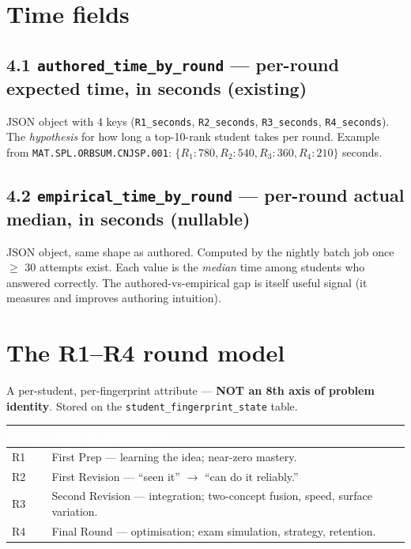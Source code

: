 \documentclass[11pt,letterpaper]{article}
\newcommand{\cd}[1]{\texttt{\small #1}}
\begin{document}
\section{Time fields}\label{sec:time}

\subsection*{4.1 \cd{authored\_time\_by\_round} --- per-round expected time, in seconds (existing)}

JSON object with 4 keys (\cd{R1\_seconds}, \cd{R2\_seconds}, \cd{R3\_seconds}, \cd{R4\_seconds}). The \emph{hypothesis} for how long a top-10-rank student takes per round. Example from \cd{MAT.SPL.ORBSUM.CNJSP.001}: $\{R_1: 780, R_2: 540, R_3: 360, R_4: 210\}$ seconds.

\subsection*{4.2 \cd{empirical\_time\_by\_round} --- per-round actual median, in seconds (nullable)}

JSON object, same shape as authored. Computed by the nightly batch job once $\geq$ 30 attempts exist. Each value is the \emph{median} time among students who answered correctly. The authored-vs-empirical gap is itself useful signal (it measures and improves authoring intuition).

\section{The R1--R4 round model}\label{sec:round}

A per-student, per-fingerprint attribute --- \textbf{NOT an 8th axis of problem identity}. Stored on the \cd{student\_fingerprint\_state} table.

\begin{tabular}{|p{1.5cm}|p{14.0cm}|}
\hline
\rowcolor{headergray}\textcolor{white}{\textbf{Code}} & \textcolor{white}{\textbf{Stage of preparation}} \\
\hline
R1 & First Prep --- learning the idea; near-zero mastery. \\
\rowcolor{altrow}R2 & First Revision --- ``seen it'' $\to$ ``can do it reliably.'' \\
R3 & Second Revision --- integration; two-concept fusion, speed, surface variation. \\
\rowcolor{altrow}R4 & Final Round --- optimisation; exam simulation, strategy, retention. \\
\hline
\end{tabular}
\end{document}
